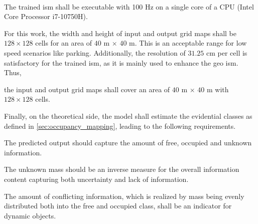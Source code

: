 \\
\begin{subreq} \label{subreq:resource_efficient_inference}
	The trained \gls{ism} shall be executable with 100 Hz on a single core of a CPU (Intel Core Processor i7-10750H).
\end{subreq}
For this work, the width and height of input and output grid maps shall be $128 \times 128$ cells for an area of $40$ m $\times$ $40$ m. This is an acceptable range for low speed scenarios like parking. Additionally, the resolution of $31.25$ cm per cell is satisfactory for the trained \gls{ism}, as it is mainly used to enhance the geo \gls{ism}. Thus,
\\
\begin{subreq} \label{subreq:grid_map_size}
	the input and output grid maps shall cover an area of $40$ m $\times$ $40$ m with $128 \times 128$ cells.
\end{subreq}
Finally, on the theoretical side, the model shall estimate the evidential classes as defined in \ref{sec:occupancy_mapping}, leading to the following requirements.
\\
\begin{subreq} \label{subreq:ev_rep}
	The predicted output should capture the amount of free, occupied and unknown information.
\end{subreq}
\vspace{\baselineskip}
\begin{subreq} \label{subreq:unknown_mass}
	The unknown mass should be an inverse measure for the overall information content capturing both uncertainty and lack of information.
\end{subreq}
\vspace{\baselineskip}
\begin{subreq} \label{subreq:conflicting_mass}
	The amount of conflicting information, which is realized by mass being evenly distributed both into the free and occupied class, shall be an indicator for dynamic objects.
\end{subreq}

%

